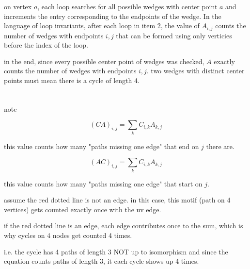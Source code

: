 \documentclass{article}
\begin{document}
on vertex \(a\), each loop searches for all possible wedges with center point \(a\) and increments the entry corresponding to the endpoints of the wedge. In the language of loop invariants, after each loop in item 2, the value of \(A_{i,j}\) counts the number of wedges with endpoints \(i,j\) that can be formed using only verticies before the index of the loop. 

in the end, since every possible center point of wedges was checked, \(A\) exactly counts the number of wedges with endpoints \(i,j\). two wedges with distinct center points must mean there is a cycle of length 4. 

\newpage
\section{}

note

\begin{equation}
  (CA)_{i,j} = \sum_k C_{i,k} A_{k,j}
\end{equation}

this value counts how many "paths missing one edge" that end on \(j\) there are. 

\begin{equation}
  (AC)_{i,j} = \sum_k C_{i,k} A_{k,j}
\end{equation}

this value counts how many "paths missing one edge" that start on \(j\). 

\begin{figure}[!ht]
\centering
{}%
\label{fig:my_label}
\end{figure}

assume the red dotted line is not an edge. in this case, this motif (path on 4 vertices) gets counted exactly once with the uv edge. 

if the red dotted line is an edge, each edge contributes once to the sum, which is why cycles on 4 nodes get counted 4 times. 

i.e. the cycle has 4 paths of length 3 NOT up to isomorphism and since the equation counts paths of length 3, it each cycle shows up 4 times.

\section{}
\end{document}
